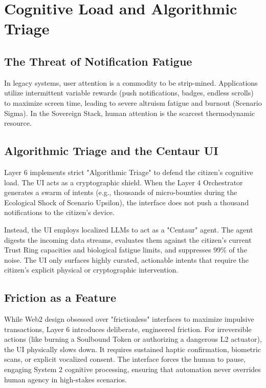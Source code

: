 \chapter{Cognitive Load and Algorithmic Triage}

\section{The Threat of Notification Fatigue}
In legacy systems, user attention is a commodity to be strip-mined. Applications utilize intermittent variable rewards (push notifications, badges, endless scrolls) to maximize screen time, leading to severe altruism fatigue and burnout (Scenario Sigma). In the Sovereign Stack, human attention is the scarcest thermodynamic resource. 

\section{Algorithmic Triage and the Centaur UI}
Layer 6 implements strict "Algorithmic Triage" to defend the citizen's cognitive load. The UI acts as a cryptographic shield. When the Layer 4 Orchestrator generates a swarm of intents (e.g., thousands of micro-bounties during the Ecological Shock of Scenario Upsilon), the interface does not push a thousand notifications to the citizen's device.

Instead, the UI employs localized LLMs to act as a "Centaur" agent. The agent digests the incoming data streams, evaluates them against the citizen's current Trust Ring capacities and biological fatigue limits, and suppresses 99\% of the noise. The UI only surfaces highly curated, actionable intents that require the citizen's explicit physical or cryptographic intervention.

\section{Friction as a Feature}
While Web2 design obsessed over "frictionless" interfaces to maximize impulsive transactions, Layer 6 introduces deliberate, engineered friction. For irreversible actions (like burning a Soulbound Token or authorizing a dangerous L2 actuator), the UI physically slows down. It requires sustained haptic confirmation, biometric scans, or explicit vocalized consent. The interface forces the human to pause, engaging System 2 cognitive processing, ensuring that automation never overrides human agency in high-stakes scenarios.

